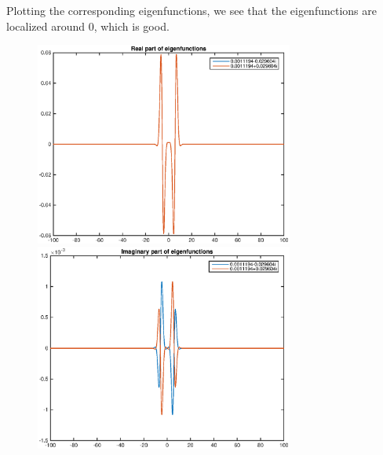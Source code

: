 \documentclass[12pt]{article}
\begin{document}
Plotting the corresponding eigenfunctions, we see that the eigenfunctions are localized around 0, which is good.
\begin{figure}[H]
\includegraphics[width=8.5cm]{eigs1real.eps}
\includegraphics[width=8.5cm]{eigs1imag.eps}
\end{figure}
\end{document}
